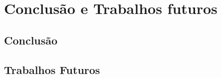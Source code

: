 \chapter{Conclusão e Trabalhos futuros}
\label{Cap:Conclusoes}

\section{Conclusão}
\section{Trabalhos Futuros}



